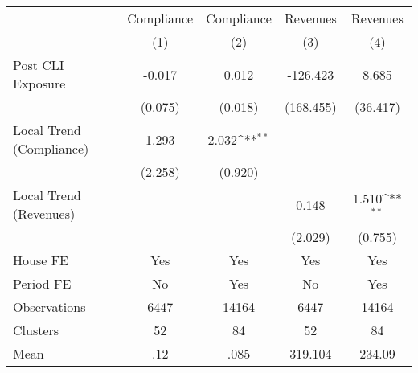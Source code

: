 {
\def\sym#1{\ifmmode^{#1}\else\(^{#1}\)\fi}
\begin{tabular}{l*{4}{c}}
\hline\hline
                &\multicolumn{1}{c}{Compliance}&\multicolumn{1}{c}{Compliance}&\multicolumn{1}{c}{Revenues}&\multicolumn{1}{c}{Revenues}\\
                &\multicolumn{1}{c}{(1)}         &\multicolumn{1}{c}{(2)}         &\multicolumn{1}{c}{(3)}         &\multicolumn{1}{c}{(4)}         \\
\hline
Post CLI Exposure&   -0.017         &    0.012         & -126.423         &    8.685         \\
                &  (0.075)         &  (0.018)         &(168.455)         & (36.417)         \\
Local Trend (Compliance)&    1.293         &    2.032\sym{**} &                  &                  \\
                &  (2.258)         &  (0.920)         &                  &                  \\
Local Trend (Revenues)&                  &                  &    0.148         &    1.510\sym{**} \\
                &                  &                  &  (2.029)         &  (0.755)         \\
House FE        &      Yes         &      Yes         &      Yes         &      Yes         \\
Period FE       &       No         &      Yes         &       No         &      Yes         \\
\hline
Observations    &     6447         &    14164         &     6447         &    14164         \\
Clusters        &       52         &       84         &       52         &       84         \\
Mean            &      .12         &     .085         &  319.104         &   234.09         \\
\hline\hline
\end{tabular}
}
